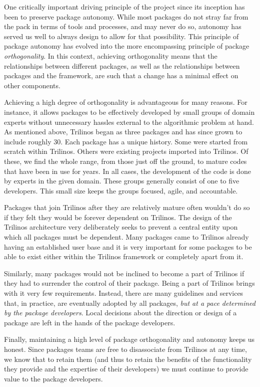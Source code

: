 \documentclass{doublecol}
\begin{document}
One critically important driving principle of the project since its
inception has been to preserve package autonomy.  While most
packages do not stray far from the pack in terms of tools and
processes, and may never do so, autonomy has served us well to
always design to allow for that possibility.  This principle of
package autonomy has evolved into the more encompassing principle of
package \emph{orthogonality}.  In this context, achieving
orthogonality means that the relationships between different
packages, as well as the relationships between packages and the
framework, are such that a change has a minimal effect on other
components.

Achieving a high degree of orthogonality is advantageous for many
reasons. For instance, it allows packages to be effectively
developed by small groups of domain experts without unnecessary
hassles external to the algorithmic problem at hand.  As mentioned
above, Trilinos began as three packages and has since grown to
include roughly 30. Each package has a unique history. Some were
started from scratch within Trilinos.  Others were existing projects
imported into Trilinos.  Of these, we find the whole range, from
those just off the ground, to mature codes that have been in use for
years. In all cases, the development of the code is done by experts
in the given domain.  These groups generally consist of one to five
developers. This small size keeps the groups focused, agile, and
accountable.

Packages that join Trilinos after they are relatively mature often
wouldn't do so if they felt they would be forever dependent on
Trilinos.  The design of the Trilinos architecture very deliberately
seeks to prevent a central entity upon which all packages must be
dependent.  Many packages came to Trilinos already having an
established user base and it is very important for some packages to
be able to exist either within the Trilinos framework or completely
apart from it.

Similarly, many packages would not be inclined to become a part of
Trilinos if they had to surrender the control of their package.
Being a part of Trilinos brings with it very few requirements.
Instead, there are many guidelines and services that, in practice,
are eventually adopted by all packages, \emph{but at a pace
determined by the package developers}. Local decisions about the
direction or design of a package are left in the hands of the
package developers.

Finally, maintaining a high level of package orthogonality and
autonomy keeps us honest. Since packages teams are free to
disassociate from Trilinos at any time, we know that to retain them
(and thus to retain the benefits of the functionality they provide
and the expertise of their developers) we must continue to provide
value to the package developers.
\end{document}
